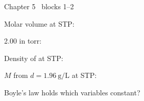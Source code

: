 \documentclass{apchem-worksheet}
\begin{document}
\begin{spiralstrip}{Chapter 5 \textbullet\ blocks 1--2}
  \item Molar volume at STP: 
  \item \SI{2.00}{\atm} in torr: 
  \item Density of  at STP:
  \item $M$ from $d = \SI{1.96}{\gram\per\liter}$ at STP:
  \item Boyle's law holds which variables constant?
\end{spiralstrip}
\end{document}
